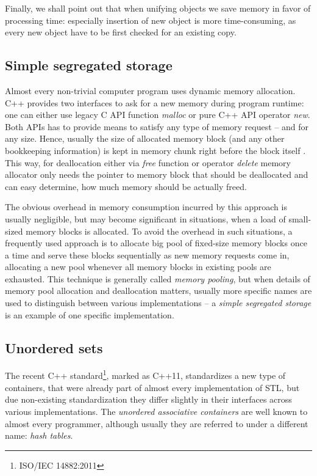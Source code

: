 Finally, we shall point out that when unifying objects we save memory in favor
of processing time: especially insertion of new object is more time-consuming,
as every new object have to be first checked for an existing copy.

\subsection{Simple segregated storage}

Almost every non-trivial computer program uses dynamic memory allocation.
C++ provides two interfaces to ask for a new memory during program runtime:
one can either use legacy C API function \emph{malloc} or pure C++ API operator \emph{new}.
Both APIs has to provide means to satisfy any type of memory request -- and for any size.
Hence, usually the size of allocated memory block (and any other bookkeeping information) is
kept in memory chunk right before the block itself \citep[Chapter 10]{meyers:effective-cpp}.
This way, for deallocation either via \emph{free} function or operator \emph{delete}
memory allocator only needs the pointer to memory block that should be deallocated and
can easy determine, how much memory should be actually freed.

The obvious overhead in memory consumption incurred by this approach is usually negligible,
but may become significant in situations, when a load of small-sized memory blocks is allocated.
To avoid the overhead in such situations, a frequently used approach is to allocate big pool of
fixed-size memory blocks once a time and serve these blocks sequentially as new memory requests
come in, allocating a new pool whenever all memory blocks in existing pools are exhausted.
This technique is generally called \emph{memory pooling}, but when details of
memory pool allocation and deallocation matters, usually more specific names are used to
distinguish between various implementations --  a \emph{simple segregated storage} is an example
of one specific
implementation.


\subsection{Unordered sets}

The recent C++ standard\footnote{ISO/IEC 14882:2011}, marked as C++11, standardizes
a new type of containers, that were already part of almost every implementation of STL,
but due non-existing standardization they differ slightly in their interfaces across
various implementations.
The \emph{unordered associative containers} are well known to almost every programmer,
although usually they are referred to under a different name: \emph{hash tables}.

